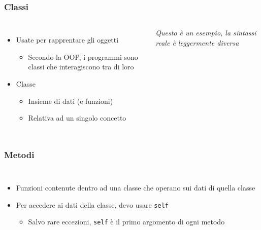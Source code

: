 \begin{contentframe}
    \frametitle{Classi}

    \begin{columns}
        \begin{itemize}
            \item Usate per rapprentare gli oggetti
            \begin{itemize}
                \item Secondo la OOP, i programmi sono classi che interagiscono tra di loro
            \end{itemize}

            \bigskip
            \item Classe
            \begin{itemize}
                \item Insieme di dati (e funzioni)
                \item Relativa ad un singolo concetto
            \end{itemize}
        \end{itemize}
        
        \centering
        
        {
            \footnotesize
            \textit{Questo è un esempio, la sintassi reale è leggermente diversa}
        }
    \end{columns}
\end{contentframe}


\begin{contentframe}
    \frametitle{Metodi}

    \begin{columns}
        \begin{itemize}
            \item Funzioni contenute dentro ad una classe che operano sui dati di quella classe

            \bigskip
            \item Per accedere ai dati della classe, devo usare \texttt{self}
            \begin{itemize}
                \item Salvo rare eccezioni, \texttt{self} è il primo argomento di ogni metodo
            \end{itemize}
        \end{itemize}
        
        \centering
    \end{columns}
\end{contentframe}

